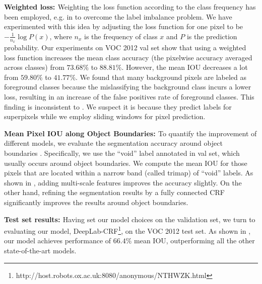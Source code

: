 {\bf{Weighted loss: }} Weighting the loss function according to the class frequency has been employed, e.g. in \cite{mostajabi2014feedforward} to overcome the label imbalance problem. We have experimented with this idea by adjusting the loss function for one pixel to be $-\frac{1}{n_{x}} \log P(x)$, where $n_x$ is the frequency of class $x$ and $P$ is the prediction probability. Our experiments on VOC 2012 val set show that using a weighted loss function increases the mean class accuracy (the pixelwise accuracy averaged across classes) from $73.68\%$ to $88.81\%$. However, the mean IOU decreases a lot from $59.80\%$ to $41.77\%$. We found that many background pixels are labeled as foreground classes because the mislassifying the background class incurs a lower  loss, resulting in an increase of  the false positives rate of  foreground classes. This finding is inconsistent to \citet{mostajabi2014feedforward}. We suspect it is because they predict labels for superpixels while we employ sliding windows for pixel prediction.

{\bf{Mean Pixel IOU along Object Boundaries: }}
To quantify the improvement of different models, we evaluate the segmentation accuracy around object boundaries \citep{kohli2009robust, krahenbuhl2011efficient}. Specifically, we  use  the ``void'' label annotated in val set, which usually occurs around object boundaries. We compute the mean IOU for those pixels that are located within a narrow band (called trimap) of ``void'' labels. As shown in , adding multi-scale features improves the accuracy slightly. On the other hand, refining the segmentation results by a fully connected CRF significantly improves the results around object boundaries. 

{\bf{Test set results: }} Having set our model choices on the validation set, we turn to evaluating our model, DeepLab-CRF\footnote{http://host.robots.ox.ac.uk:8080/anonymous/NTHWZK.html}, on the VOC 2012 test set. As shown in , our model achieves performance of $66.4\%$ mean IOU, outperforming all the other state-of-the-art models. 

